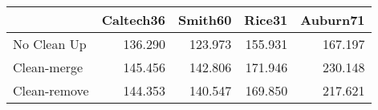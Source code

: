 \begin{tabular}{lrrrr}
\toprule
{} & Caltech36 & Smith60 &  Rice31 & Auburn71 \\
\midrule
No Clean Up  &   136.290 & 123.973 & 155.931 &  167.197 \\
Clean-merge  &   145.456 & 142.806 & 171.946 &  230.148 \\
Clean-remove &   144.353 & 140.547 & 169.850 &  217.621 \\
\bottomrule
\end{tabular}
